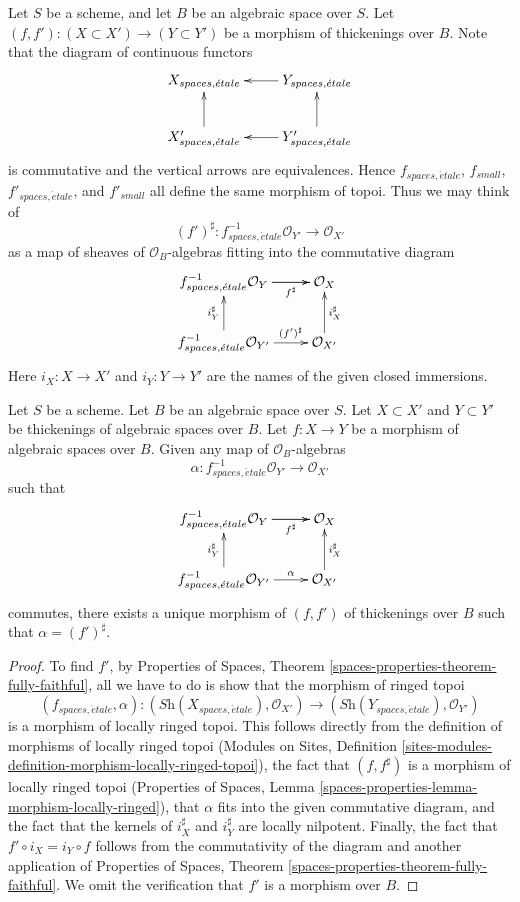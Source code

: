 \medskip\noindent
Let $S$ be a scheme, and let $B$ be an algebraic space over $S$.
Let $(f, f') : (X \subset X') \to (Y \subset Y')$ be a morphism of
thickenings over $B$. Note that the diagram of continuous functors
$$
\xymatrix{
X_{spaces, \acute{e}tale} &
Y_{spaces, \acute{e}tale} \ar[l] \\
X'_{spaces, \acute{e}tale} \ar[u] &
Y'_{spaces, \acute{e}tale} \ar[u] \ar[l]
}
$$
is commutative and the vertical arrows are equivalences. Hence
$f_{spaces, \acute{e}tale}$, $f_{small}$,
$f'_{spaces, \acute{e}tale}$, and $f'_{small}$
all define the same morphism of topoi. Thus we may think of
$$
(f')^\sharp :
f_{spaces, \acute{e}tale}^{-1}\mathcal{O}_{Y'}
\longrightarrow
\mathcal{O}_{X'}
$$
as a map of sheaves of $\mathcal{O}_B$-algebras fitting into the commutative
diagram
$$
\xymatrix{
f_{spaces, \acute{e}tale}^{-1}\mathcal{O}_Y \ar[r]_-{f^\sharp} \ar[r] &
\mathcal{O}_X \\
f_{spaces, \acute{e}tale}^{-1}\mathcal{O}_{Y'} \ar[r]^-{(f')^\sharp}
\ar[u]^{i_Y^\sharp} &
\mathcal{O}_{X'} \ar[u]_{i_X^\sharp}
}
$$
Here $i_X : X \to X'$ and $i_Y : Y \to Y'$ are the names of the given
closed immersions.

\begin{lemma}
\label{lemma-first-order-thickening-maps}
Let $S$ be a scheme. Let $B$ be an algebraic space over $S$.
Let $X \subset X'$ and $Y \subset Y'$ be thickenings
of algebraic spaces over $B$. Let $f : X \to Y$ be a morphism of algebraic
spaces over $B$. Given any map of $\mathcal{O}_B$-algebras
$$
\alpha : f_{spaces, \acute{e}tale}^{-1}\mathcal{O}_{Y'} \to \mathcal{O}_{X'}
$$
such that
$$
\xymatrix{
f_{spaces, \acute{e}tale}^{-1}\mathcal{O}_Y \ar[r]_-{f^\sharp} \ar[r] &
\mathcal{O}_X \\
f_{spaces, \acute{e}tale}^{-1}\mathcal{O}_{Y'} \ar[r]^-\alpha
\ar[u]^{i_Y^\sharp} &
\mathcal{O}_{X'} \ar[u]_{i_X^\sharp}
}
$$
commutes, there exists a unique morphism of $(f, f')$ of
thickenings over $B$ such that $\alpha = (f')^\sharp$.
\end{lemma}

\begin{proof}
To find $f'$, by
Properties of Spaces, Theorem \ref{spaces-properties-theorem-fully-faithful},
all we have to do is show that the morphism of ringed topoi
$$
(f_{spaces, \acute{e}tale}, \alpha) :
(\textit{Sh}(X_{spaces, \acute{e}tale}), \mathcal{O}_{X'})
\longrightarrow
(\textit{Sh}(Y_{spaces, \acute{e}tale}), \mathcal{O}_{Y'})
$$
is a morphism of locally ringed topoi. This follows directly
from the definition of morphisms of locally ringed topoi
(Modules on Sites,
Definition \ref{sites-modules-definition-morphism-locally-ringed-topoi}),
the fact that $(f, f^\sharp)$ is a morphism of locally ringed topoi
(Properties of Spaces,
Lemma \ref{spaces-properties-lemma-morphism-locally-ringed}),
that $\alpha$ fits into the given commutative diagram, and
the fact that the kernels of $i_X^\sharp$ and $i_Y^\sharp$ are
locally nilpotent. Finally, the fact that $f' \circ i_X = i_Y \circ f$
follows from the commutativity of the diagram and another application of
Properties of Spaces, Theorem \ref{spaces-properties-theorem-fully-faithful}.
We omit the verification that $f'$ is a morphism over $B$.
\end{proof}

